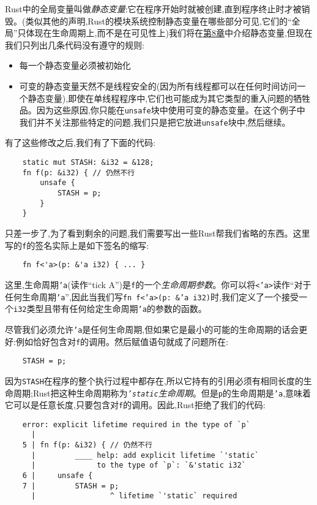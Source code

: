 Rust中的全局变量叫做\emph{静态变量}:它在程序开始时就被创建,直到程序终止时才被销毁。(类似其他的声明,Rust的模块系统控制静态变量在哪些部分可见,它们的“全局”只体现在生命周期上,而不是在可见性上)我们将在\hyperref[ch08]{第8章}中介绍静态变量,但现在我们只列出几条代码没有遵守的规则:
\begin{itemize}
    \item 每一个静态变量必须被初始化
    \item 可变的静态变量天然不是线程安全的(因为所有线程都可以在任何时间访问一个静态变量),即使在单线程程序中,它们也可能成为其它类型的重入问题的牺牲品。因为这些原因,你只能在\texttt{unsafe}块中使用可变的静态变量。在这个例子中我们并不关注那些特定的问题,我们只是把它放进\texttt{unsafe}块中,然后继续。
\end{itemize}

有了这些修改之后,我们有了下面的代码:
\begin{verbatim}
    static mut STASH: &i32 = &128;
    fn f(p: &i32) { // 仍然不行
        unsafe {
            STASH = p;
        }
    }
\end{verbatim}

只差一步了,为了看到剩余的问题,我们需要写出一些Rust帮我们省略的东西。这里写的\texttt{f}的签名实际上是如下签名的缩写:
\begin{verbatim}
    fn f<'a>(p: &'a i32) { ... }
\end{verbatim}

这里,生命周期\texttt{'a}(读作“tick A”)是\texttt{f}的一个\emph{生命周期参数}。你可以将\texttt{<'a>}读作“对于任何生命周期\texttt{'a}”,因此当我们写\texttt{fn f<'a>(p: \&'a i32)}时,我们定义了一个接受一个\texttt{i32}类型且带有任何给定生命周期\texttt{'a}的参数的函数。

尽管我们必须允许\texttt{'a}是任何生命周期,但如果它是最小的可能的生命周期的话会更好:例如恰好包含对\texttt{f}的调用。然后赋值语句就成了问题所在:
\begin{verbatim}
    STASH = p;
\end{verbatim}

因为\texttt{STASH}在程序的整个执行过程中都存在,所以它持有的引用必须有相同长度的生命周期;Rust把这种生命周期称为\emph{\texttt{'static}生命周期}。但是\texttt{p}的生命周期是\texttt{'a},意味着它可以是任意长度,只要包含对\texttt{f}的调用。因此,Rust拒绝了我们的代码:
\begin{verbatim}
    error: explicit lifetime required in the type of `p`
      |
    5 | fn f(p: &i32) { // 仍然不行
      |         ____ help: add explicit lifetime `'static`
      |              to the type of `p`: `&'static i32`
    6 |     unsafe {
    7 |         STASH = p;
      |                 ^ lifetime `'static` required
\end{verbatim}

